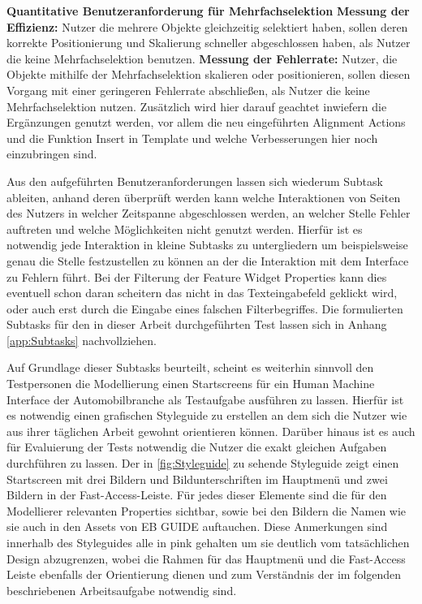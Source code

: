 \textbf{Quantitative Benutzeranforderung für Mehrfachselektion}\newline
\textbf{Messung der Effizienz:}
Nutzer die mehrere Objekte gleichzeitig selektiert haben, sollen deren korrekte Positionierung  und Skalierung schneller abgeschlossen haben, als Nutzer die keine Mehrfachselektion benutzen.\newline
\textbf{Messung der Fehlerrate:}
Nutzer, die Objekte mithilfe der Mehrfachselektion skalieren oder positionieren, sollen diesen Vorgang mit einer geringeren Fehlerrate abschließen, als Nutzer die keine Mehrfachselektion nutzen.
Zusätzlich wird hier darauf geachtet inwiefern die Ergänzungen genutzt werden, vor allem die neu eingeführten \glqq Alignment Actions\grqq{} und die Funktion \glqq Insert in Template\grqq{} und welche Verbesserungen hier noch einzubringen sind.

Aus den aufgeführten Benutzeranforderungen lassen sich wiederum Subtask ableiten, anhand deren überprüft werden kann welche Interaktionen von Seiten des Nutzers in welcher Zeitspanne abgeschlossen werden, an welcher Stelle Fehler auftreten und welche Möglichkeiten nicht genutzt werden.
Hierfür ist es notwendig jede Interaktion in kleine Subtasks zu untergliedern um beispielsweise genau die Stelle festzustellen zu können an der die Interaktion mit dem Interface zu Fehlern führt.
Bei der Filterung der Feature Widget Properties kann dies eventuell schon daran scheitern das nicht in das Texteingabefeld geklickt wird, oder auch erst durch die Eingabe eines falschen Filterbegriffes.
Die formulierten Subtasks für den in dieser Arbeit durchgeführten Test lassen sich in Anhang \ref{app:Subtasks} nachvollziehen.

Auf Grundlage dieser Subtasks beurteilt, scheint es weiterhin sinnvoll den Testpersonen die Modellierung einen Startscreens für ein Human Machine Interface der Automobilbranche als Testaufgabe ausführen zu lassen.
Hierfür ist es notwendig einen grafischen Styleguide zu erstellen an dem sich die Nutzer wie aus ihrer täglichen Arbeit gewohnt orientieren können.
Darüber hinaus ist es auch für Evaluierung der Tests notwendig die Nutzer die exakt gleichen Aufgaben durchführen zu lassen.
Der in \cref{fig:Styleguide} zu sehende Styleguide zeigt einen Startscreen mit drei Bildern und Bildunterschriften im Hauptmenü und zwei Bildern in der Fast-Access-Leiste.
Für jedes dieser Elemente sind die für den Modellierer relevanten Properties sichtbar, sowie bei den Bildern die Namen wie sie auch in den Assets von EB GUIDE auftauchen.
Diese Anmerkungen sind innerhalb des Styleguides alle in pink gehalten um sie deutlich vom tatsächlichen Design abzugrenzen, wobei die Rahmen für das Hauptmenü und die Fast-Access Leiste ebenfalls der Orientierung dienen und zum Verständnis der im folgenden beschriebenen Arbeitsaufgabe notwendig sind.

